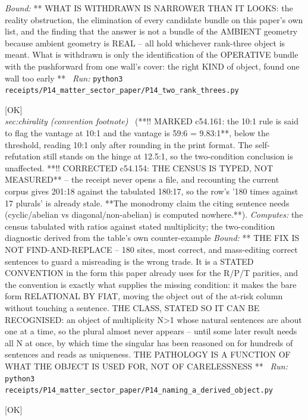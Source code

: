 \begin{description}
 \emph{Bound:} ** WHAT IS WITHDRAWN IS NARROWER THAN IT LOOKS: the reality obstruction, the elimination of every candidate bundle on this paper's own list, and the finding that the answer is not a bundle of the AMBIENT geometry because ambient geometry is REAL -- all hold whichever rank-three object is meant. What is withdrawn is only the identification of the OPERATIVE bundle with the pushforward from one wall's cover: the right KIND of object, found one wall too early **
\ \emph{Run:} \texttt{python3 receipts/P14\_matter\_sector\_paper/P14\_two\_rank\_threes.py}
\item[\rcptlabel{P14_naming_a_derived_object}{P14R34}\textbf{P14R34}\quad\texttt{P14\_naming\_a\_derived\_object}]\hfill\textsf{[OK]}\\
\textit{sec:chirality (convention footnote)} \ (**!! MARKED c54.161: the 10:1 rule is said to flag the vantage at 10:1 and the vantage is 59:6 = 9.83:1**, below the threshold, reading 10:1 only after rounding in the print format. The self-refutation still stands on the hinge at 12.5:1, so the two-condition conclusion is unaffected. **!! CORRECTED c54.154: THE CENSUS IS TYPED, NOT MEASURED** -- the receipt never opens a file, and recounting the current corpus gives 201:18 against the tabulated 180:17, so the row's '180 times against 17 plurals' is already stale. **The monodromy claim the citing sentence needs (cyclic/abelian vs diagonal/non-abelian) is computed nowhere.**). 
\emph{Computes:} the census tabulated with ratios against stated multiplicity; the two-condition diagnostic derived from the table's own counter-example
 \emph{Bound:} ** THE FIX IS NOT FIND-AND-REPLACE -- 180 sites, most correct, and mass-editing correct sentences to guard a misreading is the wrong trade. It is a STATED CONVENTION in the form this paper already uses for the R/P/T parities, and the convention is exactly what supplies the missing condition: it makes the bare form RELATIONAL BY FIAT, moving the object out of the at-risk column without touching a sentence. THE CLASS, STATED SO IT CAN BE RECOGNISED: an object of multiplicity N>1 whose natural sentences are about one at a time, so the plural almost never appears -- until some later result needs all N at once, by which time the singular has been reasoned on for hundreds of sentences and reads as uniqueness. THE PATHOLOGY IS A FUNCTION OF WHAT THE OBJECT IS USED FOR, NOT OF CARELESSNESS **
\ \emph{Run:} \texttt{python3 receipts/P14\_matter\_sector\_paper/P14\_naming\_a\_derived\_object.py}
\item[\rcptlabel{P14_the_family_symmetry_is_cyclic}{P14R35}\textbf{P14R35}\quad\texttt{P14\_the\_family\_symmetry\_is\_cyclic}]\hfill\textsf{[OK]}\\

\end{description}
